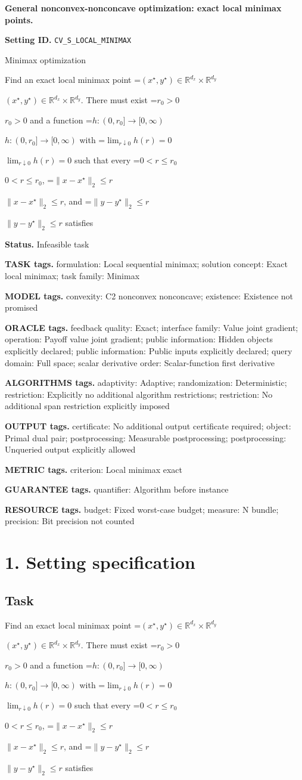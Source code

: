 \documentclass[10pt,a4paper]{article}
\newcommand{\AtlasMath}[1]{\par\begingroup\centering\setbox0=\hbox{$\displaystyle #1$}\ifdim\wd0>1.4\linewidth\typeout{ATLAS WIDE FORMULA: \the\wd0}\fi\ifdim\wd0>\linewidth\resizebox{\linewidth}{!}{\box0}\else\box0\fi\par\endgroup}
\newcommand{\AtlasInlineMath}[1]{\begingroup\setbox0=\hbox{$#1$}\ifdim\wd0>.4\linewidth\endgroup\AtlasMath{#1}\else\endgroup$#1$\fi}
\begin{document}
\raggedright

{\LARGE\bfseries\sffamily\color{AtlasNavy} General nonconvex-nonconcave optimization: exact local minimax points.\par}\vspace{5pt}
\textbf{Setting ID.} \texttt{CV\_\allowbreak{}S\_\allowbreak{}LOCAL\_\allowbreak{}MINIMAX}

Minimax optimization

Find an exact local minimax point \AtlasInlineMath{(x^\star,y^\star)\in\mathbb R^{d_x}\times\mathbb R^{d_y}}. There must exist \AtlasInlineMath{r_0>0} and a function \AtlasInlineMath{h:(0,r_0]\to[0,\infty)} with \AtlasInlineMath{\lim_{r\downarrow0}h(r)=0} such that every \AtlasInlineMath{0<r\le r_0}, \AtlasInlineMath{\|x-x^\star\|_2\le r}, and \AtlasInlineMath{\|y-y^\star\|_2\le r} satisfies

\textbf{Status.} Infeasible task

\textbf{TASK tags.} formulation: Local sequential minimax; solution concept: Exact local minimax; task family: Minimax

\textbf{MODEL tags.} convexity: C2 nonconvex nonconcave; existence: Existence not promised

\textbf{ORACLE tags.} feedback quality: Exact; interface family: Value joint gradient; operation: Payoff value joint gradient; public information: Hidden objects explicitly declared; public information: Public inputs explicitly declared; query domain: Full space; scalar derivative order: Scalar-function first derivative

\textbf{ALGORITHMS tags.} adaptivity: Adaptive; randomization: Deterministic; restriction: Explicitly no additional algorithm restrictions; restriction: No additional span restriction explicitly imposed

\textbf{OUTPUT tags.} certificate: No additional output certificate required; object: Primal dual pair; postprocessing: Measurable postprocessing; postprocessing: Unqueried output explicitly allowed

\textbf{METRIC tags.} criterion: Local minimax exact

\textbf{GUARANTEE tags.} quantifier: Algorithm before instance

\textbf{RESOURCE tags.} budget: Fixed worst-case budget; measure: N bundle; precision: Bit precision not counted

\section{1. Setting specification}
\subsection{Task}
Find an exact local minimax point \AtlasInlineMath{(x^\star,y^\star)\in\mathbb R^{d_x}\times\mathbb R^{d_y}}. There must exist \AtlasInlineMath{r_0>0} and a function \AtlasInlineMath{h:(0,r_0]\to[0,\infty)} with \AtlasInlineMath{\lim_{r\downarrow0}h(r)=0} such that every \AtlasInlineMath{0<r\le r_0}, \AtlasInlineMath{\|x-x^\star\|_2\le r}, and \AtlasInlineMath{\|y-y^\star\|_2\le r} satisfies
\end{document}
